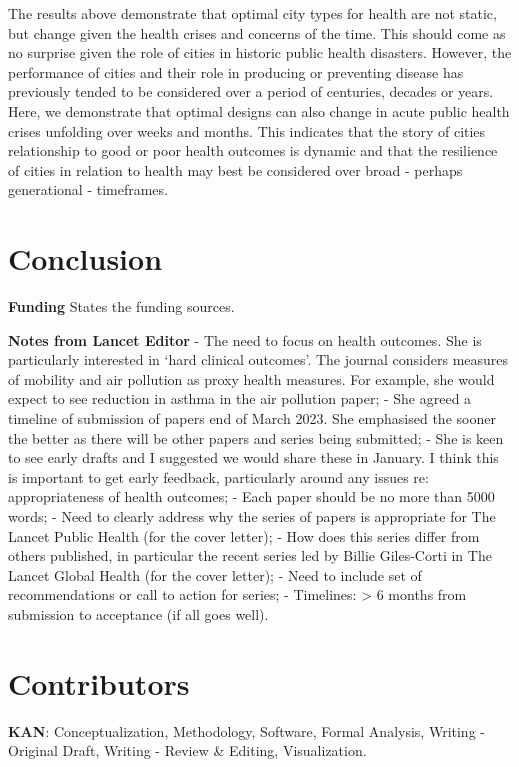 \documentclass[preprint,12pt]{elsarticle}
\begin{document}
The results above demonstrate that optimal city types for health are not static, but change given the health crises and concerns of the time. This should come as no surprise given the role of cities in historic public health disasters. However, the performance of cities and their role in producing or preventing disease has previously tended to be considered over a period of centuries, decades or years. Here, we demonstrate that optimal designs can also change in acute public health crises unfolding over weeks and months. This indicates that the story of cities relationship to good or poor health outcomes is dynamic and that the resilience of cities in relation to health may best be considered over broad - perhaps generational - timeframes.  







\section*{Conclusion}

\textbf{Funding} States the funding sources.

\textbf{Notes from Lancet Editor} 
-	The need to focus on health outcomes. She is particularly interested in ‘hard clinical outcomes’. The journal considers measures of mobility and air pollution as proxy health measures. For example, she would expect to see reduction in asthma in the air pollution paper; 
-	She agreed a timeline of submission of papers end of March 2023. She emphasised the sooner the better as there will be other papers and series being submitted; 
-	She is keen to see early drafts and I suggested we would share these in January. I think this is important to get early feedback, particularly around any issues re: appropriateness of health outcomes;
-	Each paper should be no more than 5000 words;
-	Need to clearly address why the series of papers is appropriate for The Lancet Public Health (for the cover letter);
-	How does this series differ from others published, in particular the recent series led by Billie Giles-Corti in The Lancet Global Health (for the cover letter);
-	Need to include set of recommendations or call to action for series;
-	Timelines: > 6 months from submission to acceptance (if all goes well).







\section*{Contributors}\label{sec:credit}
\textbf{KAN}: Conceptualization, Methodology, Software, Formal Analysis, Writing - Original Draft, Writing - Review \& Editing, Visualization.
\end{document}
